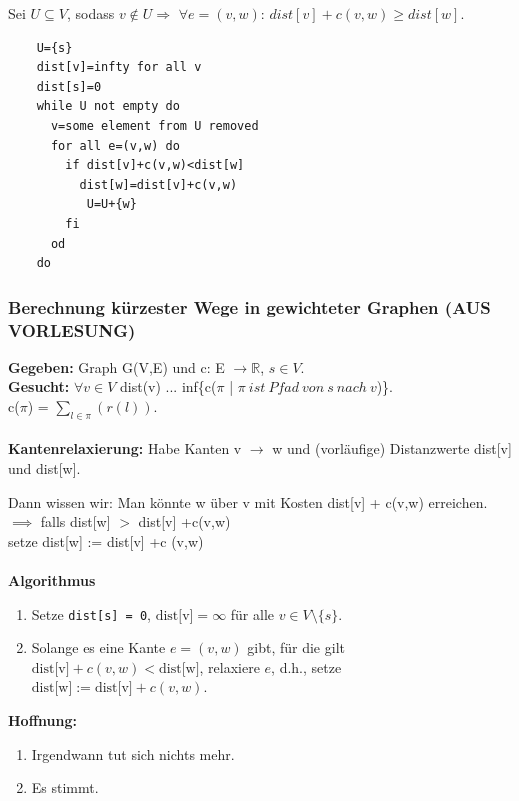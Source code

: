 \documentclass{article}
\begin{document}
Sei $U\subseteq V$, sodass $v\notin U \Rightarrow$ $\forall e=(v,w)$: $dist[v]+c(v,w)\geq dist[w]$.

\begin{verbatim}
	U={s}
	dist[v]=infty for all v
	dist[s]=0	
	while U not empty do
	  v=some element from U removed
	  for all e=(v,w) do
	    if dist[v]+c(v,w)<dist[w]
	      dist[w]=dist[v]+c(v,w)
	       U=U+{w}
	    fi
	  od
	do 

\end{verbatim}

\subsubsection{Berechnung kürzester Wege in gewichteter Graphen (AUS VORLESUNG)}
\textbf{Gegeben:} Graph G(V,E) und c: E $ \rightarrow \mathbb{R}$, $s \in V$.\\
\textbf{Gesucht:} $\forall v \in V$ dist(v) ... inf\{c($\pi$ | $\pi\ ist\ Pfad\ von\ s\ nach\ v$)\}.\\

c($\pi$) = $\sum_{l \in \pi}^{}(r(l)) $.\\
\\
\textbf{Kantenrelaxierung:} Habe Kanten v $\longrightarrow$ w und (vorläufige) Distanzwerte dist[v] und dist[w].

 Dann wissen wir: Man könnte w über v mit Kosten dist[v] + c(v,w) erreichen.\\
$\implies $ falls dist[w] $>$ dist[v] +c(v,w) \\
 setze dist[w] := dist[v] +c (v,w)\\
\\
\textbf{Algorithmus}
\begin{enumerate}[label=\textbf{\arabic*)}] %
    \item Setze \texttt{dist[s] = 0}, \(\text{dist[v]} = \infty\) für alle \( v \in V \setminus \{ s \} \). \\
    \item Solange es eine Kante \( e = (v, w) \) gibt, für die gilt \( \text{dist[v]} + c(v, w) < \text{dist[w]} \), relaxiere \( e \), d.h., setze \(\text{dist[w]} := \text{dist[v]} + c(v, w)\).
\end{enumerate}

\vspace{0.5em} %

\textbf{Hoffnung:}
\begin{enumerate}[label=\textbf{\arabic*)}] %
    \item Irgendwann tut sich nichts mehr.
    \item Es stimmt.
\end{enumerate}
\end{document}
